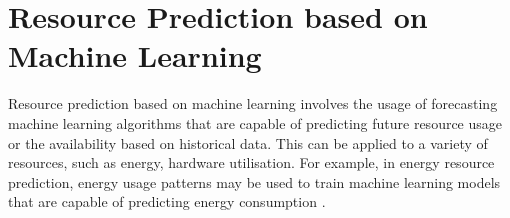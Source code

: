 
    
    \section{Resource Prediction based on Machine Learning}
    \label{sec:resource-prediction-based-on-machine-learning-related-work}
    
        Resource prediction based on machine learning involves the usage of forecasting machine learning algorithms that are capable of predicting future resource usage or the availability based on historical data.
        This can be applied to a variety of resources, such as energy, hardware utilisation.
        For example, in energy resource prediction, energy usage patterns may be used to train machine learning models that are capable of predicting energy consumption \cite{shapiEnergyConsumptionPrediction2021} \cite{richDeepMindAIReduces2016}.

